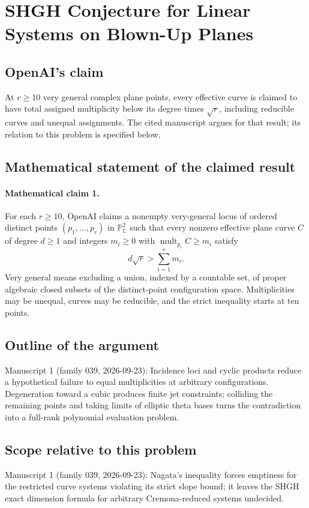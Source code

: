 \documentclass[11pt]{article}
\begin{document}
\section*{SHGH Conjecture for Linear Systems on Blown-Up Planes}

\subsection{OpenAI's claim}
At $r\ge10$ very general complex plane points, every effective curve is claimed to have total assigned multiplicity below its degree times $\sqrt r$, including reducible curves and unequal assignments. The cited manuscript argues for that result; its relation to this problem is specified below.

\subsection{Mathematical statement of the claimed result}
\paragraph{Mathematical claim 1.} For each $r\ge10$, OpenAI claims a nonempty very-general locus of ordered distinct points $(p_1,\ldots,p_r)$ in $\mathbb P^2_{\mathbb C}$ such that every nonzero effective plane curve $C$ of degree $d\ge1$ and integers $m_i\ge0$ with $\operatorname{mult}_{p_i}C\ge m_i$ satisfy
\[
d\sqrt r>\sum_{i=1}^r m_i.
\]
Very general means excluding a union, indexed by a countable set, of proper algebraic closed subsets of the distinct-point configuration space. Multiplicities may be unequal, curves may be reducible, and the strict inequality starts at ten points.

\subsection{Outline of the argument}
Manuscript 1 (family 039, 2026-09-23): Incidence loci and cyclic products reduce a hypothetical failure to equal multiplicities at arbitrary configurations. Degeneration toward a cubic produces finite jet constraints; colliding the remaining points and taking limits of elliptic theta bases turns the contradiction into a full-rank polynomial evaluation problem.

\subsection{Scope relative to this problem}
Manuscript 1 (family 039, 2026-09-23): Nagata’s inequality forces emptiness for the restricted curve systems violating its strict slope bound; it leaves the SHGH exact dimension formula for arbitrary Cremona-reduced systems undecided.
\end{document}
